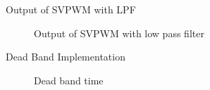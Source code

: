\begin{frame}{Output of SVPWM with LPF}
	\begin{figure}
		\centering


		\caption{Output of SVPWM with low pass filter}
	\end{figure}
\end{frame}

\begin{frame}{Dead Band Implementation}
	\begin{figure}
		\centering

		\caption{Dead band time}
	\end{figure}
\end{frame}



